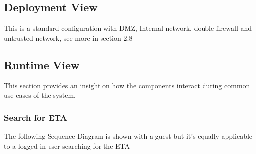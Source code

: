 \documentclass{article}
\begin{document}
\subsection{Deployment View}
\begin{figure}[H]
\end{figure}
		This is a standard configuration with DMZ, Internal network, double firewall and untrusted network, see more in section 2.8
\subsection{Runtime View}
This section provides an insight on how the components interact during common use cases of the system.
\subsubsection{Search for ETA}
The following Sequence Diagram is shown with a guest but it's equally applicable to a logged in user searching for the ETA\footnotemark\ 
\begin{figure}[H]
\end{figure}
\end{document}
